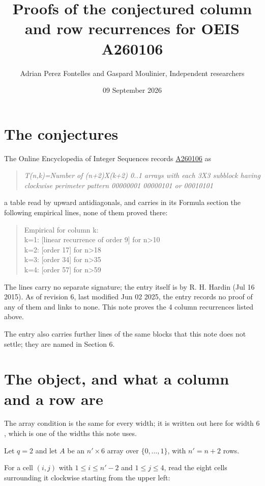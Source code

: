 \documentclass[11pt]{article}
\title{Proofs of the conjectured column and row recurrences for OEIS A260106}
\author{Adrian Perez Fontelles and Gaspard Moulinier, Independent researchers}
\date{09 September 2026}
\theoremstyle{definition}
\begin{document}
\maketitle
\section{The conjectures}

The Online Encyclopedia of Integer Sequences records \href{https://oeis.org/A260106}{A260106} as

\begin{quote}\itshape T(n,k)=Number of (n+2)X(k+2) 0..1 arrays with each 3X3 subblock having clockwise perimeter pattern 00000001 00000101 or 00010101\end{quote}

a table read by upward antidiagonals, and carries in its Formula section the following empirical lines, none of them proved there:

\begin{quote}\ttfamily Empirical for column k:\\
k=1: [linear recurrence of order 9] for n>10\\k=2: [order 17] for n>18\\k=3: [order 34] for n>35\\k=4: [order 57] for n>59\end{quote}

The lines carry no separate signature; the entry itself is by R. H. Hardin (Jul 16 2015). As of revision 6, last modified Jun 02 2025, the entry records no proof of any of them and links to none. This note proves the 4 column recurrences listed above.

The entry also carries further lines of the same blocks that this note does not settle; they are named in Section 6.

\section{The object, and what a column and a row are}

The array condition is the same for every width; it is written out here for width $6$, which is one of the widths this note uses.

Let $q = 2$ and let $A$ be an $n' \times 6$ array over $\{0,\dots,1\}$, with $n' = n + 2$ rows.

For a cell $(i,j)$ with $1 \le i \le n'-2$ and $1 \le j \le 4$, read the eight cells surrounding it clockwise starting from the upper left:
\end{document}
